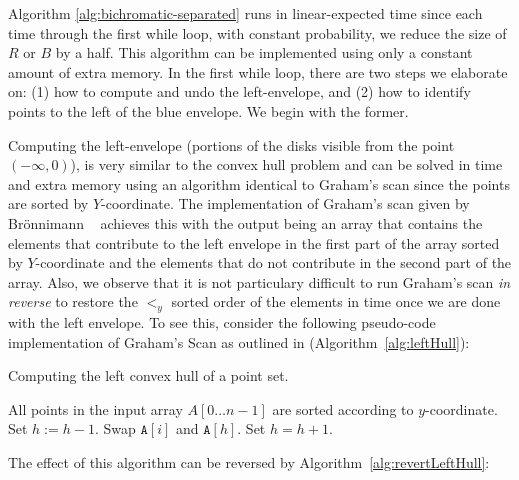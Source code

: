 Algorithm \ref{alg:bichromatic-separated} runs in linear-expected time since
each time through the first while loop, with constant probability, we reduce
the size of $R$ or $B$ by a half.  This algorithm can be implemented using
only a constant amount of extra memory.  In the first while loop, there are
two steps we elaborate on: (1) how to compute and undo the left-envelope, and
(2) how to identify points to the left of the blue envelope. We begin with the
former.

Computing the left-envelope (portions of the disks visible
from the point $(-\infty, 0)$), is very similar to the convex hull
problem and can be solved in  time and  extra memory using an algorithm identical
to Graham's scan since the points are sorted by $Y$-coordinate.  The
implementation of Graham's scan given by Br\"onnimann
\etal~\cite{bronnimann:convex} achieves this with the output being an 
array that contains the elements that contribute to the left envelope
in the first part of the array sorted by $Y$-coordinate and the elements that do not contribute
in the second part of the array. Also, we observe that it is not
particulary difficult to run Graham's scan {\em in reverse} to restore
the $<_y$ sorted order of the elements in  time once we are done
with the left envelope. To see this, consider the following
pseudo-code implementation of Graham's Scan as outlined in \cite{bronnimann:convex}
(Algorithm~\ref{alg:leftHull}):

\begin{algorithm}
  \caption{Computing the left convex hull of a point set.}
  \label{alg:leftHull}
  \begin{algorithmic}[1]
    \REQUIRE All points in the input array $A[0\ldots n-1]$ are sorted according to
    $y$-coordinate.
        \STATE Set $h:=h-1$.
      \ENDWHILE
      \STATE Swap $\texttt{A}[i]$ and $\texttt{A}[h]$.
      \STATE Set $h=h+1$.
    \ENDFOR
  \end{algorithmic}
\end{algorithm}

The effect of this algorithm can be reversed by
Algorithm~\ref{alg:revertLeftHull}:

